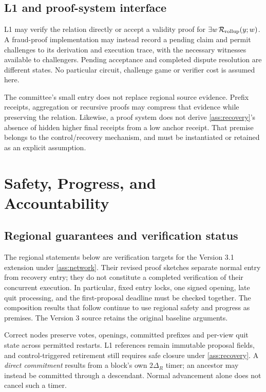 \documentclass[11pt,a4paper,onecolumn]{article}
\begin{document}
\subsection{L1 and proof-system interface}
L1 may verify the relation directly or accept a validity proof for
$\exists w\,\mathcal R_{\rm rollup}(y;w)$. A fraud-proof implementation may
instead record a pending claim and permit challenges to its derivation and
execution trace, with the necessary witnesses available to challengers.
Pending acceptance and completed dispute resolution are different states.
No particular circuit, challenge game or verifier cost is assumed here.

The committee's small entry does not replace regional source evidence.
Prefix receipts, aggregation or recursive proofs may compress that evidence
while preserving the relation. Likewise, a proof system does not derive
\cref{ass:recovery}'s absence of hidden higher final receipts from a low
anchor receipt. That premise belongs to the control/recovery mechanism,
and must be instantiated or retained as an explicit assumption.

\section{Safety, Progress, and Accountability}\label{sec:security}
\subsection{Regional guarantees and verification status}
\label{sec:rotation-verification}
The regional statements below are verification targets for the Version 3.1
extension under \cref{ass:network}. Their revised proof sketches separate
normal entry from recovery entry; they do not constitute a completed
verification of their concurrent execution. In particular, fixed entry locks,
one signed opening, late quit processing, and the first-proposal deadline
must be checked together. The composition results that follow continue to
use regional safety and progress as premises. The Version 3 source retains
the original baseline arguments.

Correct nodes preserve votes, openings, committed prefixes and per-view quit
state across permitted restarts. L1 references remain immutable proposal
fields, and control-triggered retirement still requires safe closure under
\cref{ass:recovery}. A \emph{direct commitment} results from a block's own
$2\Delta_R$ timer; an ancestor may instead be committed through a descendant.
Normal advancement alone does not cancel such a timer.
\end{document}
